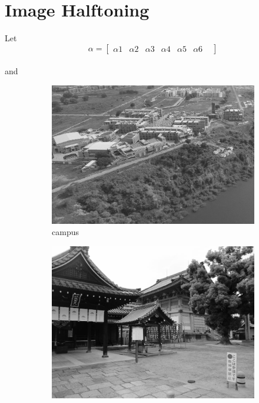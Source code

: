 \documentclass{article}
\begin{document}
\section{Image Halftoning}
Let \[
    \alpha=
    \begin{bmatrix} 
    \alpha1 &
    \alpha2 &
    \alpha3 &
    \alpha4 &
    \alpha5 &
    \alpha6 &
    \end{bmatrix}
    \]
    \\
    and\\
\begin{figure}[h!]
  \centering
  \begin{subfigure}[b]{0.4\linewidth}
    \includegraphics[width=\linewidth]{campus.png}
     \caption{campus}
  \end{subfigure}
  \begin{subfigure}[b]{0.4\linewidth}
    \includegraphics[width=\linewidth]{1_user.jpg}

\end{subfigure}
\end{figure}
\end{document}
